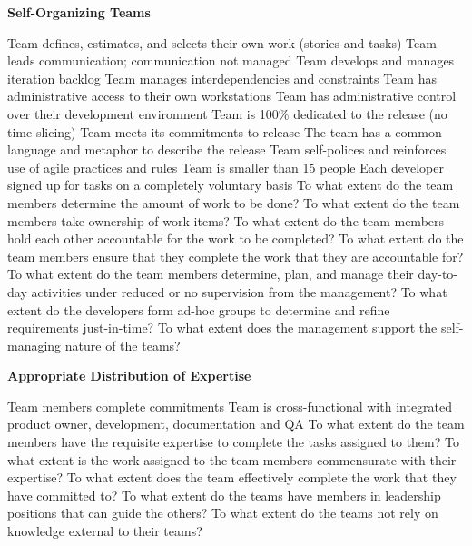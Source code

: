 \textbf{Self-Organizing Teams}
\begin{itemize}
	\taa Team defines, estimates, and selects their own work (stories and tasks)
	\taa Team leads communication; communication not managed %
	\taa Team develops and manages iteration backlog %
	\taa Team manages interdependencies and constraints %
	\taa Team has administrative access to their own workstations%
	\taa Team has administrative control over their development environment%
	\taa Team is 100\% dedicated to the release (no time-slicing)%
	\taa Team meets its commitments to release%
	\taa The team has a common language and metaphor to describe the release%
	\taa Team self-polices and reinforces use of agile practices and rules%
	\taa Team is smaller than 15 people%
	\pam Each developer signed up for tasks on a completely voluntary basis
	\ops To what extent do the team members determine the amount of work to be done? 
	\ops To what extent do the team members take ownership of work items?
	\ops To what extent do the team members hold each other accountable for the work to be completed?
	\ops To what extent do the team members ensure that they complete the work that they are accountable for?
	\ops To what extent do the team members determine, plan, and manage their day-to-day activities under reduced or no supervision from the management?
	\ops To what extent do the developers form ad-hoc groups to determine and refine requirements just-in-time?
	\ops To what extent does the management support the self-managing nature of the teams?
\end{itemize}

\textbf{Appropriate Distribution of Expertise}
\begin{itemize}
	\taa Team members complete commitments
	\taa Team is cross-functional with integrated product owner, development, documentation and QA%
	\ops To what extent do the team members have the requisite expertise to complete the tasks assigned to them?
	\ops To what extent is the work assigned to the team members commensurate with their expertise?
	\ops To what extent does the team effectively complete the work that they have committed to? 
	\ops To what extent do the teams have members in leadership positions that can guide the others?
	\ops To what extent do the teams not rely on knowledge external to their teams? 
\end{itemize}

